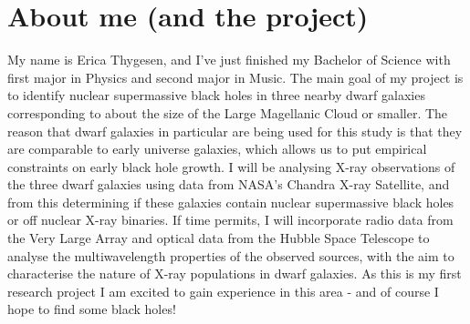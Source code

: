 \section{About me (and the project)}
My name is Erica Thygesen, and I’ve just finished my Bachelor of Science with first 
major in Physics and second major in Music. The main goal of my project is to identify 
nuclear supermassive black holes in three nearby dwarf galaxies corresponding to about the 
size of the Large Magellanic Cloud or smaller. The reason that dwarf galaxies in particular 
are being used for this study is that they are comparable to early universe galaxies, which 
allows us to put empirical constraints on early black hole growth. I will be analysing X-ray 
observations of the three dwarf galaxies using data from NASA’s Chandra X-ray Satellite, and 
from this determining if these galaxies contain nuclear supermassive black holes or off 
nuclear X-ray binaries. If time permits, I will incorporate radio data from the Very Large 
Array and optical data from the Hubble Space Telescope to analyse the multiwavelength 
properties of the observed sources, with the aim to characterise the nature of X-ray 
populations in dwarf galaxies. As this is my first research project I am excited to gain 
experience in this area - and of course I hope to find some black holes!
